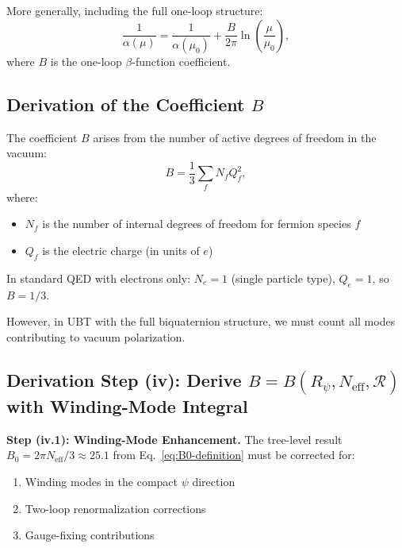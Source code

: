 \documentclass[11pt,a4paper]{article}
\theoremstyle{remark}
\begin{document}
More generally, including the full one-loop structure:
\begin{equation}
\frac{1}{\alpha(\mu)} = \frac{1}{\alpha(\mu_0)} + \frac{B}{2\pi} \ln\left(\frac{\mu}{\mu_0}\right),
\label{eq:alpha-running}
\end{equation}
where $B$ is the one-loop $\beta$-function coefficient.

\subsection{Derivation of the Coefficient $B$}

The coefficient $B$ arises from the number of active degrees of freedom in the vacuum:
\begin{equation}
B = \frac{1}{3} \sum_f N_f Q_f^2,
\label{eq:B-formula}
\end{equation}
where:
\begin{itemize}
\item $N_f$ is the number of internal degrees of freedom for fermion species $f$
\item $Q_f$ is the electric charge (in units of $e$)
\end{itemize}

In standard QED with electrons only: $N_e = 1$ (single particle type), $Q_e = 1$, so $B = 1/3$.

However, in UBT with the full biquaternion structure, we must count all modes contributing to vacuum polarization.

\subsection{Derivation Step (iv): Derive $B = B(R_\psi, N_{\text{eff}}, \mathcal{R})$ with Winding-Mode Integral}

\textbf{Step (iv.1): Winding-Mode Enhancement.} The tree-level result $B_0 = 2\pi N_{\text{eff}}/3 \approx 25.1$ from Eq.~\eqref{eq:B0-definition} must be corrected for:
\begin{enumerate}
\item Winding modes in the compact $\psi$ direction
\item Two-loop renormalization corrections
\item Gauge-fixing contributions
\end{enumerate}
\end{document}
